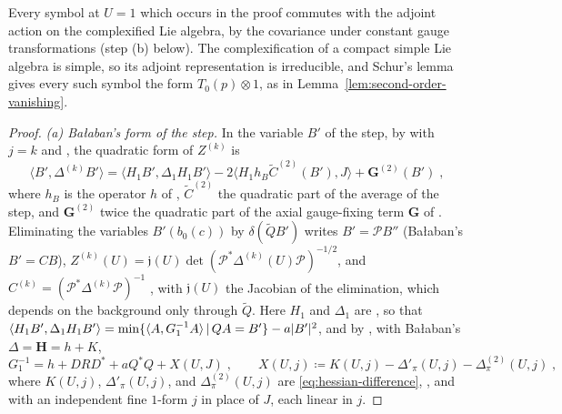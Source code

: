 \documentclass[11pt]{preprint}
\DeclarePairedDelimiter{\abs}{\lvert}{\rvert}
\numberwithin{equation}{section}
\theoremstyle{definition}
\theoremstyle{remark}
\theoremstyle{plain}
\begin{document}
Every symbol at $U = 1$ which occurs in the proof commutes with the adjoint action on the complexified Lie algebra, by the covariance under constant gauge transformations (step (b) below). The complexification of a compact simple Lie algebra is simple, so its adjoint representation is irreducible, and Schur's lemma gives every such symbol the form $T_0(p) \otimes 1$, as in Lemma~\ref{lem:second-order-vanishing}.

\begin{proof}
\emph{(a) Ba{\l}aban's form of the step.} In the variable $B'$ of the step, by \cite[(1.5), p.~261]{BalabanRG1} with $j = k$ and \cite[(2.11), p.~267]{BalabanRG1}, the quadratic form of $Z^{(k)}$ is
\begin{equation}\label{eq:step-form}
    \langle B', \Delta^{(k)}B' \rangle = \langle H_1B', \Delta_1H_1B' \rangle - 2\langle H_1h_B\tilde C^{(2)}(B'), J \rangle + \mathbf G^{(2)}(B')\;,
\end{equation}
where $h_B$ is the operator $h$ of \cite[(2.4), p.~266]{BalabanRG1}, $\tilde C^{(2)}$ the quadratic part of the average of the step, and $\mathbf G^{(2)}$ twice the quadratic part of the axial gauge-fixing term $\mathbf G$ of \cite[(2.5), p.~266]{BalabanRG1}. Eliminating the variables $B'(b_0(c))$ by $\delta(\tilde QB')$ writes $B' = \mathcal PB''$ (Ba{\l}aban's $B' = CB$), $Z^{(k)}(U) = \mathfrak j(U)\det(\mathcal P^*\Delta^{(k)}(U)\mathcal P)^{-1/2}$, and $C^{(k)} = (\mathcal P^*\Delta^{(k)}\mathcal P)^{-1}$ \cite[pp.~267--268]{BalabanRG1}, with $\mathfrak j(U)$ the Jacobian of the elimination, which depends on the background only through $\tilde Q$. Here $H_1$ and $\Delta_1$ are \cite[(3.127)--(3.129), p.~421]{BalabanPBG}, so that $\langle H_1B', \Delta_1H_1B' \rangle = \min\{ \langle A, G_1^{-1}A \rangle \, | \, QA = B' \} - a\abs{B'}^2$, and by \cite[(3.128), (3.120), (3.134)--(3.135)]{BalabanPBG}, with Ba{\l}aban's $\Delta = \mathbf H = h + K$,
\begin{equation}\label{eq:g-one-inverse}
    G_1^{-1} = h + DRD^* + aQ^*Q + X(U, J)\;,
    \qquad
    X(U, j) \coloneqq K(U, j) - \Delta'_\pi(U, j) - \Delta^{(2)}_\pi(U, j)\;,
\end{equation}
where $K(U, j)$, $\Delta'_\pi(U, j)$, and $\Delta^{(2)}_\pi(U, j)$ are \eqref{eq:hessian-difference}, \cite[(3.120)]{BalabanPBG}, and \cite[(3.134)--(3.135)]{BalabanPBG} with an independent fine $1$-form $j$ in place of $J$, each linear in $j$.


\end{proof}
\end{document}
